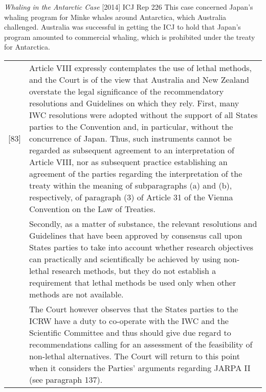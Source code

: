 \begin{casedetails}{\textit{Whaling in the Antarctic Case} [2014] ICJ Rep 226}\label{case:Antarctic Whaling}
    \flushleft
    This case concerned Japan's whaling program for Minke whales around Antarctica, which Australia challenged. Australia was successful in getting the ICJ to hold that Japan's program amounted to commercial whaling, which is prohibited under the treaty for Antarctica.

    \tcblower

    \begin{longtable}{r|>{\raggedright\arraybackslash}p{}}
        [83] & Article VIII expressly contemplates the use of lethal methods, and the Court is of the view that Australia and New Zealand overstate the legal significance of the recommendatory resolutions and Guidelines on which they rely. First, many IWC resolutions were adopted without the support of all States parties to the Convention and, in particular, without the concurrence of Japan. Thus, such instruments cannot be regarded as subsequent agreement to an interpretation of Article VIII, nor as subsequent practice establishing an agreement of the parties regarding the interpretation of the treaty within the meaning of subparagraphs (a) and (b), respectively, of paragraph (3) of Article 31 of the Vienna Convention on the Law of Treaties. \\

         & Secondly, as a matter of substance, the relevant resolutions and Guidelines that have been approved by consensus call upon States parties to take into account whether research objectives can practically and scientifically be achieved by using non-lethal research methods, but they do not establish a requirement that lethal methods be used only when other methods are not available. \\

         & The Court however observes that the States parties to the ICRW have a duty to co-operate with the IWC and the Scientific Committee and thus should give due regard to recommendations calling for an assessment of the feasibility of non-lethal alternatives. The Court will return to this point when it considers the Parties' arguments regarding JARPA II (see paragraph 137).
    \end{longtable} 
\end{casedetails}

